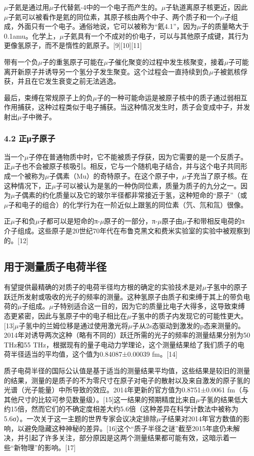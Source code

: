 $\mu$子氦是通过用$\mu$子代替氦-4中的一个电子而产生的。$\mu$子轨道离原子核更近，因此$\mu$子氦可以被看作是氦的同位素，其原子核由两个中子、两个质子和一个$\mu$子组成，外面只有一个电子。通俗地说，它可以被称为“氦4.1”，因为$\mu$子的质量略大于0.1amu。化学上，$\mu$子氦具有一个不成对的价电子，可以与其他原子成键，其行为更像氢原子，而不是惰性的氦原子。[9][10][11]

带有一个负$\mu$子的重氢原子可能在$\mu$子催化聚变的过程中发生核聚变，接着$\mu$子可能离开新原子并诱导另一个氢分子发生聚变。这个过程会一直持续到负$\mu$子被氦核俘获，并且在它发生衰变之前无法逃逸。

最后，束缚在常规原子上的负$\mu$子的一种可能命运是被原子核中的质子通过弱相互作用捕获，这种过程类似于电子捕获。当这种情况发生时，质子会变成中子，并发射出$\mu$子中微子。
\subsubsection{4.2 正μ子原子}
当一个$\mu$子停在普通物质中时，它不能被质子俘获，因为它需要的是一个反质子。正$\mu$子也不会被原子核吸引。相反，它与一个随机电子结合，并与这个电子共同形成一个被称为$\mu$子偶素（Mu）的奇特原子。在这个原子中，$\mu$子充当了原子核。在这种情况下，正$\mu$子可以被认为是氢的一种伪同位素，质量为质子的九分之一。因为$\mu$子偶素的约化质量以及它的玻尔半径都非常接近于氢，这种短命的“原子”（或$\mu$子和电子的组合）的化学行为在一阶近似上跟氢的同位素（氕、氘和氚）很像。

正$\mu$子和负$\mu$子都可以是短命的π-$\mu$原子的一部分，π-$\mu$原子由$\mu$子和带相反电荷的π介子组成。这些原子是20世纪70年代在布鲁克黑文和费米实验室的实验中被观察到的。[12]
\subsection{用于测量质子电荷半径}
有望提供最精确的对质子的电荷半径均方根的确定的实验技术是对$\mu$子氢中的原子跃迁所发射或吸收的光子的频率的测量。这种氢原子由质子和束缚于其上的带负电荷的$\mu$子组成。$\mu$子特别适合这一目的，因为它的质量比电子大得多，这导致束缚态更紧密，因此与氢原子中的电子相比在$\mu$子氢中的质子内发现它的可能性更大。[13]$\mu$子氢中的兰姆位移是通过使用激光将$\mu$子从2s态驱动到激发的p态来测量的。2014年对诱导两次这种（略有不同的）跃迁所需的光子的频率的测量结果分别为50 THz和55 THz，根据现有的量子电动力学理论，这个测量结果给了我们质子的电荷半径适当的平均值，这个值为0.84087±0.00039 fm。[14]

质子电荷半径的国际公认值是基于适当的测量结果平均值，这些结果是较旧的测量的结果，测量的是质子的不为零尺寸在原子对电子的散射以及来自激发的原子氢的光谱（光子能量）中所导致的效应。2014年更新的官方值为0.8751±0.0061 fm（与其他尺寸的比较可参见数量级）。[15]这一结果的预期精度比来自$\mu$子氢的结果低大约15倍，然而它们的不确定度相差大约5.6倍（这种差异在科学计数法中被称为5.6σ）。一次关于这一主题的世界专家会议决定排除$\mu$子结果对2014年官方数值的影响，以避免隐藏这种神秘的差异。[16]这个“质子半径之谜”截至2015年底仍未解决，并引起了许多关注，部分原因是这两个测量结果都可能有效，这暗示着一些“新物理”的影响。[17]
